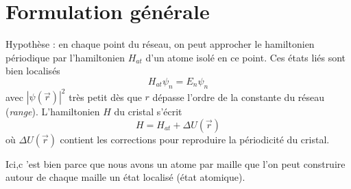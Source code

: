 \section{Formulation générale}
Hypothèse : en chaque point du réseau, on peut approcher le  hamiltonien périodique 
par l'hamiltonien $H_{at}$ d'un atome isolé en ce point. Ces états liés sont bien 
localisés
\begin{equation}
H_{at}\psi_n = E_n\psi_n
\end{equation}
avec $|\psi(\vec{r})|^2$ très petit dès que $r$ dépasse l'ordre de la constante du 
réseau (\textit{range}).
L'hamiltonien $H$ du cristal s'écrit
\begin{equation}
H = H_{at} + \Delta U(\vec{r})
\end{equation}
où $\Delta U(\vec{r})$ contient les corrections pour reproduire la périodicité du 
cristal.

\danger Ici,c 'est bien parce que nous avons un atome par maille que l'on peut 
construire autour de chaque maille un état localisé (état atomique).\\

